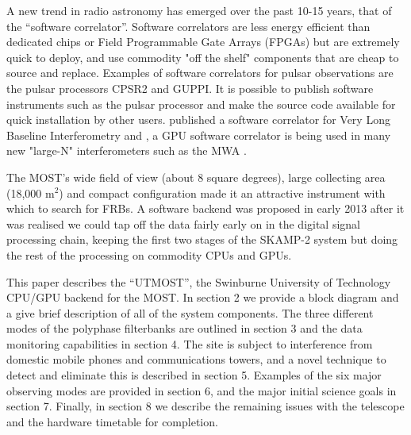 A new trend in radio astronomy has emerged over the past 10-15 years, that of the ``software correlator''. Software correlators are less energy efficient than dedicated chips or Field Programmable Gate Arrays (FPGAs) but are extremely quick to deploy, and use commodity "off the shelf" components that are cheap to source and replace. Examples of software correlators for pulsar observations are the pulsar processors CPSR2 \citep{Bailes_2009} and GUPPI\citep{DuPlain_2008}. It is possible to publish software instruments such as the pulsar processor  \citep{van_Straten_2011} and make the source code available for quick installation by other users. \citep{Deller_2007} published  a software correlator for Very Long Baseline Interferometry and  \citep{Clark_2012}, a GPU software correlator is being used in many new "large-N" interferometers such as the MWA \citep{Tingay_2013}. 

The MOST's wide field of view (about 8 square degrees), large collecting area (18,000 m$^2$) and compact configuration made it an attractive instrument with which to search for FRBs. A software backend was proposed in early 2013 after it was realised we could tap off the data fairly early on in the digital signal processing chain, keeping the first two stages of the SKAMP-2 system but doing the rest of the processing on commodity CPUs and GPUs. 

This paper describes the ``UTMOST'', the Swinburne University of Technology CPU/GPU backend for the MOST. In section 2 we provide a block diagram and a give brief description of all of the system components. The three different modes of the polyphase filterbanks are outlined in section 3 and the data monitoring capabilities in section 4. The site is subject to interference from domestic mobile phones and communications towers, and a novel technique to detect and eliminate this is described in section 5. Examples of the six major observing modes are provided in section 6, and the major initial science goals in section 7. Finally, in section 8 we describe the remaining issues with the telescope and the hardware timetable for completion.



